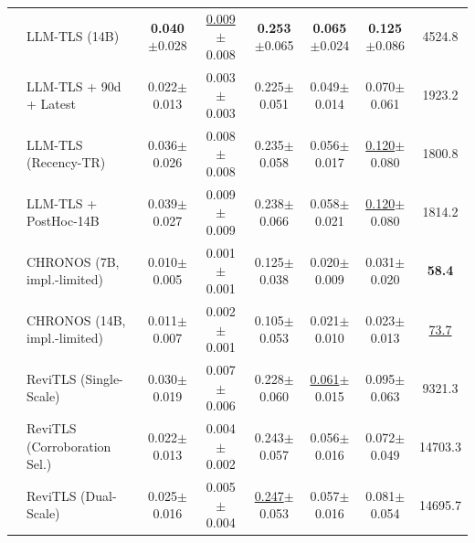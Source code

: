 \begin{tabular}{@{}llcccccc@{}}
  & LLM-TLS (14B) & \textbf{0.040}{\tiny$\pm$0.028} & \underline{0.009}{\tiny$\pm$0.008} & \textbf{0.253}{\tiny$\pm$0.065} & \textbf{0.065}{\tiny$\pm$0.024} & \textbf{0.125}{\tiny$\pm$0.086} & 4524.8 \\
  & LLM-TLS + 90d + Latest & 0.022{\tiny$\pm$0.013} & 0.003{\tiny$\pm$0.003} & 0.225{\tiny$\pm$0.051} & 0.049{\tiny$\pm$0.014} & 0.070{\tiny$\pm$0.061} & 1923.2 \\
  & LLM-TLS (Recency-TR) & 0.036{\tiny$\pm$0.026} & 0.008{\tiny$\pm$0.008} & 0.235{\tiny$\pm$0.058} & 0.056{\tiny$\pm$0.017} & \underline{0.120}{\tiny$\pm$0.080} & 1800.8 \\
  & LLM-TLS + PostHoc-14B & 0.039{\tiny$\pm$0.027} & 0.009{\tiny$\pm$0.009} & 0.238{\tiny$\pm$0.066} & 0.058{\tiny$\pm$0.021} & \underline{0.120}{\tiny$\pm$0.080} & 1814.2 \\
  & CHRONOS (7B, impl.-limited) & 0.010{\tiny$\pm$0.005} & 0.001{\tiny$\pm$0.001} & 0.125{\tiny$\pm$0.038} & 0.020{\tiny$\pm$0.009} & 0.031{\tiny$\pm$0.020} & \textbf{58.4} \\
  & CHRONOS (14B, impl.-limited) & 0.011{\tiny$\pm$0.007} & 0.002{\tiny$\pm$0.001} & 0.105{\tiny$\pm$0.053} & 0.021{\tiny$\pm$0.010} & 0.023{\tiny$\pm$0.013} & \underline{73.7} \\
  & ReviTLS (Single-Scale) & 0.030{\tiny$\pm$0.019} & 0.007{\tiny$\pm$0.006} & 0.228{\tiny$\pm$0.060} & \underline{0.061}{\tiny$\pm$0.015} & 0.095{\tiny$\pm$0.063} & 9321.3 \\
  & ReviTLS (Corroboration Sel.) & 0.022{\tiny$\pm$0.013} & 0.004{\tiny$\pm$0.002} & 0.243{\tiny$\pm$0.057} & 0.056{\tiny$\pm$0.016} & 0.072{\tiny$\pm$0.049} & 14703.3 \\
  & ReviTLS (Dual-Scale) & 0.025{\tiny$\pm$0.016} & 0.005{\tiny$\pm$0.004} & \underline{0.247}{\tiny$\pm$0.053} & 0.057{\tiny$\pm$0.016} & 0.081{\tiny$\pm$0.054} & 14695.7 \\
\bottomrule
\end{tabular}

